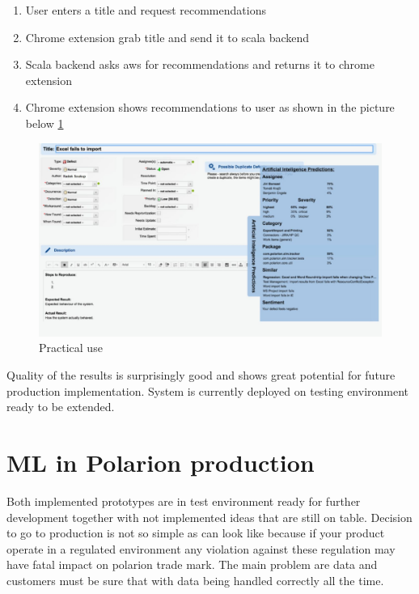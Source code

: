 \documentclass[thesis=M,english]{FITthesis}[2012/06/26]
\begin{document}
\begin{enumerate}[nosep]
	\item User enters a title and request recommendations
	\item Chrome extension grab title and send it to scala backend
	\item Scala backend asks \acrshort{aws} for recommendations and returns it to chrome extension
	\item Chrome extension shows recommendations to user as shown in the picture below \ref{fig:defect_bot_workitem}\\
\end{enumerate}

\begin{figure}[h!]\centering
	\includegraphics[width=1\textwidth]{pictures/defect_bot_workitem}
	\caption{Practical use}\label{fig:defect_bot_workitem}
\end{figure}

Quality of the results is surprisingly good and shows great potential for future production implementation. System is currently deployed on testing environment ready to be extended.

\chapter{ML in Polarion production}

Both implemented prototypes are in test environment ready for further development together with not implemented ideas that are still on table. Decision to go to production is not so simple as can look like because if your product operate in a regulated environment any violation against these regulation may have fatal impact on \acrshort{polarion} trade mark. The main problem are data and customers must be sure that with data being handled correctly all the time. \\ 
\end{document}
